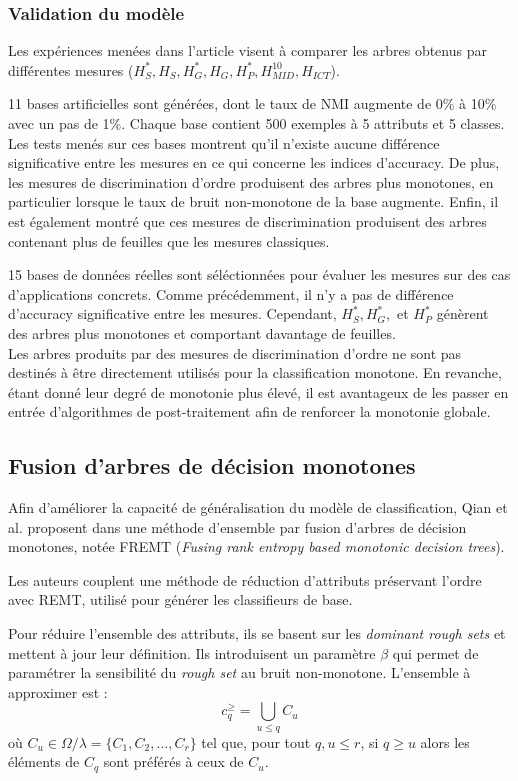 \documentclass[a4paper]{article}
\begin{document}
\subsubsection{Validation du modèle}

Les expériences menées dans l'article visent à comparer les arbres obtenus
par différentes mesures ($H^*_S, H_S, H^*_G, H_G, H^*_P, H^{10}_{MID}, H_{ICT}$).

11 bases artificielles sont générées, dont le taux de NMI augmente de 0\% à 10\%
avec un pas de 1\%. Chaque base contient 500 exemples à 5 attributs et 5
classes. \\ 
\noindent Les tests menés sur ces bases montrent qu'il n'existe
aucune différence significative entre les mesures en ce qui concerne les indices
d'accuracy. De plus, les mesures de discrimination d'ordre produisent des arbres
plus monotones, en particulier lorsque le taux de bruit non-monotone de la base
augmente. Enfin, il est également montré que ces mesures de discrimination
produisent des arbres contenant plus de feuilles que les mesures classiques.

15 bases de données réelles sont séléctionnées pour évaluer les mesures sur des
cas d'applications concrets. Comme précédemment, il n'y a pas de différence
d'accuracy significative entre les mesures. Cependant, $H^*_S, H^*_G,$ et
$H^*_P$ génèrent des arbres plus monotones et comportant davantage de feuilles.
\\

Les arbres produits par des mesures de discrimination d'ordre ne sont pas
destinés à être directement utilisés pour la classification monotone. En
revanche, étant donné leur degré de monotonie plus élevé, il est avantageux de
les passer en entrée d'algorithmes de post-traitement afin de renforcer la
monotonie globale.

\subsection{Fusion d'arbres de décision monotones} 
Afin d'améliorer la capacité de généralisation du modèle de classification, Qian
et al. proposent dans \cite{qian-fusing} une méthode d'ensemble par fusion
d'arbres de décision monotones, notée FREMT (\emph{Fusing rank entropy based
monotonic decision trees}).

Les auteurs couplent une méthode de réduction d'attributs préservant l'ordre
avec REMT, utilisé pour générer les classifieurs de base.

Pour réduire l'ensemble des attributs, ils se basent sur les \emph{dominant
rough sets} et mettent à jour leur définition. Ils introduisent un paramètre
$\beta$ qui permet de paramétrer la sensibilité du \emph{rough set} au bruit
non-monotone. L'ensemble à approximer est : 
$$c^{\geq}_q = \bigcup_{u \leq q} C_u$$
où $C_u \in \Omega / \lambda = \{C_1, C_2,...,C_r\}$ tel que, pour tout $q, u \leq r$, si $q
\geq u$ alors les éléments de $C_q$ sont préférés à ceux de $C_u$.
\end{document}
